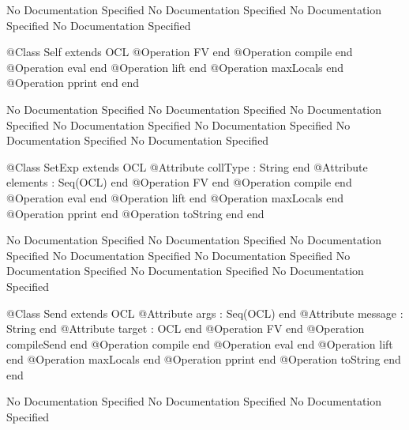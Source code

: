 No Documentation Specified
No Documentation Specified
No Documentation Specified
No Documentation Specified
\begin{Interface}
@Class Self extends OCL
  @Operation FV end
  @Operation compile end
  @Operation eval end
  @Operation lift end
  @Operation maxLocals end
  @Operation pprint end
end
\end{Interface}
No Documentation Specified
No Documentation Specified
No Documentation Specified
No Documentation Specified
No Documentation Specified
No Documentation Specified
No Documentation Specified
\begin{Interface}
@Class SetExp extends OCL
  @Attribute collType : String end
  @Attribute elements : Seq(OCL) end
  @Operation FV end
  @Operation compile end
  @Operation eval end
  @Operation lift end
  @Operation maxLocals end
  @Operation pprint end
  @Operation toString end
end
\end{Interface}
No Documentation Specified
No Documentation Specified
No Documentation Specified
No Documentation Specified
No Documentation Specified
No Documentation Specified
No Documentation Specified
No Documentation Specified
\begin{Interface}
@Class Send extends OCL
  @Attribute args : Seq(OCL) end
  @Attribute message : String end
  @Attribute target : OCL end
  @Operation FV end
  @Operation compileSend end
  @Operation compile end
  @Operation eval end
  @Operation lift end
  @Operation maxLocals end
  @Operation pprint end
  @Operation toString end
end
\end{Interface}
No Documentation Specified
No Documentation Specified
No Documentation Specified
